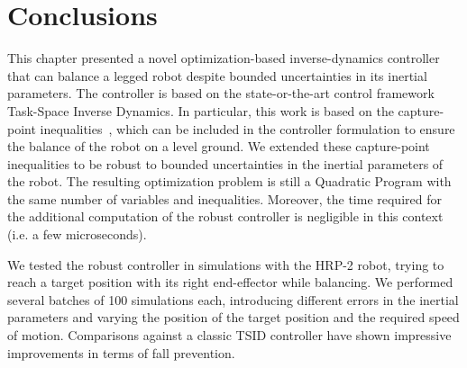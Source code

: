 
\section{Conclusions}
\label{sec:conclusions}
This chapter presented a novel optimization-based inverse-dynamics controller that can balance a legged robot despite bounded uncertainties in its inertial parameters. The controller is based on the state-or-the-art control framework Task-Space Inverse Dynamics. In particular, this work is based on the capture-point inequalities~\cite{Ramos2014a}, which can be included in the controller formulation to ensure the balance of the robot on a level ground. We extended these capture-point inequalities to be robust to bounded uncertainties in the inertial parameters of the robot. The resulting optimization problem is still a Quadratic Program with the same number of variables and inequalities. Moreover, the time required for the additional computation of the robust controller is negligible in this context (i.e. a few microseconds).

We tested the robust controller in simulations with the HRP-2 robot, trying to reach a target position with its right end-effector while balancing. We performed several batches of 100 simulations each, introducing different errors in the inertial parameters and varying the position of the target position and the required speed of motion. Comparisons against a classic TSID controller have shown impressive improvements in terms of fall prevention.

